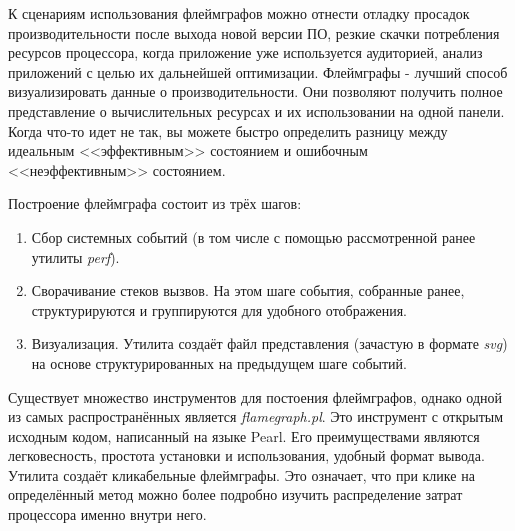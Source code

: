 К сценариям использования флеймграфов можно отнести отладку просадок производительности после выхода новой версии ПО,
резкие скачки потребления ресурсов процессора, когда приложение уже используется аудиторией, анализ приложений с целью
их дальнейшей оптимизации.
Флеймграфы - лучший способ визуализировать данные о производительности.
Они позволяют получить полное представление о вычислительных ресурсах и их использовании на одной панели. 
Когда что-то идет не так, вы можете быстро определить разницу между идеальным <<эффективным>> состоянием и ошибочным <<неэффективным>> состоянием.

Построение флеймграфа состоит из трёх шагов:
\begin{enumerate}
    \item Сбор системных событий (в том числе с помощью рассмотренной ранее утилиты \textit{perf}).
    \item Сворачивание стеков вызвов. На этом шаге события, собранные ранее, структурируются и группируются для удобного отображения.
    \item Визуализация. Утилита создаёт файл представления (зачастую в формате \textit{svg}) на основе структурированных на предыдущем шаге событий.
\end{enumerate}

Существует множество инструментов для постоения флеймграфов, однако одной из самых распространённых является \textit{flamegraph.pl}.
Это инструмент с открытым исходным кодом, написанный на языке Pearl. Его преимуществами являются легковесность, простота установки и использования,
удобный формат вывода. Утилита создаёт кликабельные флеймграфы. Это означает, что при клике на определённый метод можно более подробно изучить распределение
затрат процессора именно внутри него.
